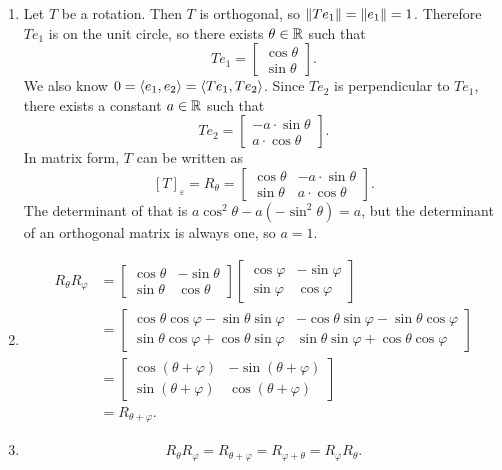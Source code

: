 \documentclass{article}
\begin{document}
\begin{enumerate}[label=(\alph*)]
    \item Let $T$ be a rotation. Then $T$ is orthogonal, so $\left\lVert Te_1\right\rVert=\left\lVert e_1\right\rVert=1$. Therefore $Te_1$ is on the unit circle, so there exists $\theta \in \mathbb{R}$ such that
        \[ Te_1 = \begin{bmatrix}
            \cos \theta \\
            \sin \theta
        \end{bmatrix}. \]
        We also know $0=\left\langle e_1, e_2 \right\rangle=\left\langle Te_1, Te_2 \right\rangle$. Since $Te_2$ is perpendicular to $Te_1$, there exists a constant $a \in \mathbb{R}$ such that
        \[ Te_2 = \begin{bmatrix}
            -a \cdot \sin \theta \\
            a \cdot \cos \theta
        \end{bmatrix}. \]
        In matrix form, $T$ can be written as
        \[ [T]_\varepsilon = R_\theta = \begin{bmatrix}
            \cos \theta & - a \cdot \sin \theta \\
            \sin \theta & a \cdot \cos \theta
        \end{bmatrix}. \]
        The determinant of that is $a \cos^2 \theta - a (-\sin^2 \theta) = a$, but the determinant of an orthogonal matrix is always one, so $a=1$.
    \item \begin{align*}
            R_\theta R_\varphi &= \begin{bmatrix}
                \cos \theta & -\sin \theta \\
                \sin \theta & \cos \theta
            \end{bmatrix} \begin{bmatrix}
                \cos \varphi & -\sin \varphi \\
                \sin \varphi & \cos \varphi
            \end{bmatrix} \\
            &= \begin{bmatrix}
                \cos \theta \cos \varphi - \sin \theta \sin \varphi & -\cos \theta \sin \varphi - \sin \theta \cos \varphi \\
                \sin \theta \cos \varphi + \cos \theta \sin \varphi & \sin \theta \sin \varphi + \cos \theta \cos \varphi
            \end{bmatrix} \\
            &= \begin{bmatrix}
                \cos(\theta + \varphi) & -\sin(\theta + \varphi) \\
                \sin(\theta + \varphi) & \cos(\theta+\varphi)
            \end{bmatrix} \\
            &= R_{\theta + \varphi}.
    \end{align*}
    \item
        \[ R_\theta R_\varphi = R_{\theta+\varphi}=R_{\varphi+\theta}=R_\varphi R_\theta. \]
\end{enumerate}
\end{document}
